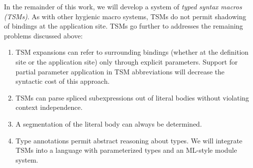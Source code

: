 {{In the remainder of this work, we will develop a system of \emph{typed syntax macros (TSMs)}. As with other hygienic macro systems, TSMs do not permit shadowing of bindings at the application site. TSMs go further to  addresses the remaining problems discussed above:
\begin{enumerate}
\item TSM expansions can refer to surrounding bindings (whether at the definition site or the application site) only through explicit parameters. Support for partial parameter application in TSM abbreviations will decrease the syntactic cost of this approach.
\item TSMs can parse spliced subexpressions out of literal bodies without violating context independence. 
\item A segmentation of the literal body can always be determined.
\item Type annotations permit abstract reasoning about types. We will integrate TSMs into a language with parameterized types and an ML-style module system.
\end{enumerate}



}}
